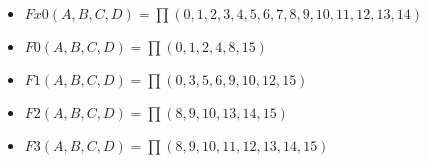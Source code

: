 \begin{itemize}
\begin{itemize}
        \item $Fx0(A,B,C,D) =  \prod(0, 1, 2, 3, 4, 5, 6, 7, 8, 9, 10, 11, 12, 13, 14)$
    
        \item $F0(A,B,C,D) =  \prod(0, 1, 2, 4, 8, 15)$
    
        \item $F1(A,B,C,D) =  \prod(0, 3, 5, 6, 9, 10, 12, 15)$
    
        \item $F2(A,B,C,D) =  \prod(8, 9, 10, 13, 14, 15)$
    
        \item $F3(A,B,C,D) =  \prod(8, 9, 10, 11, 12, 13, 14, 15)$
    
    \end{itemize}

\end{itemize}




